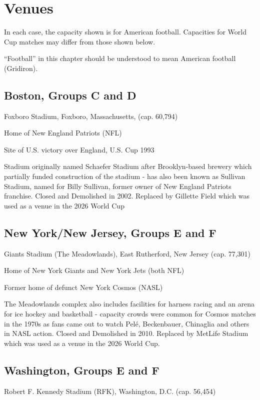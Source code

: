 \chapter{Venues}
\newline
\newline


In each case, the capacity shown is for American football. Capacities for World
Cup matches may differ from those shown below.

``Football'' in this chapter should be understood to mean American football (Gridiron).

\section{Boston, Groups C and D}
Foxboro Stadium, Foxboro, Massachusetts, (cap. 60,794)

Home of New England Patriots (NFL)

Site of U.S. victory over England, U.S. Cup 1993

Stadium originally named Schaefer Stadium after Brooklyn-based brewery which 
partially funded construction of the stadium - has also been known as Sullivan
Stadium, named for Billy Sullivan, former owner of New England Patriots 
franchise.  Closed and Demolished in 2002.   Replaced by Gillette Field which
was used as a venue in the 2026 World Cup
\section{New York/New Jersey, Groups E and F}
Giants Stadium (The Meadowlands), East Rutherford, New Jersey (cap. 77,301)

Home of New York Giants and New York Jets (both NFL)

Former home of defunct New York Cosmos (NASL)

The Meadowlands complex also includes facilities for harness racing and an 
arena for ice hockey and basketball - capacity crowds were common for Cosmos 
matches in the 1970s as fans came out to watch Pel{\'e}, Beckenbauer, Chinaglia and
others in NASL action.  Closed and Demolished in 2010.  Replaced by MetLife Stadium which
was used as a venue in the 2026 World Cup.
\section{Washington, Groups E and F}
Robert F. Kennedy Stadium (RFK), Washington, D.C. (cap. 56,454)

